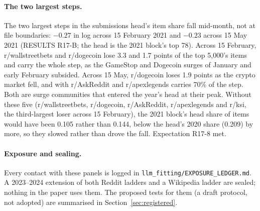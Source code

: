 \documentclass[10pt]{article}
\begin{document}
\paragraph{The two largest steps.}\label{sec:events} The two largest steps in the submissions head's item share fall mid-month, not at file boundaries: $-0.27$ in log across 15 February 2021 and $-0.23$ across 15 May 2021 (RESULTS R17-B; the head is the 2021 block's top 78). Across 15 February, r/wallstreetbets and r/dogecoin lose 3.3 and 1.7 points of the top 5,000's items and carry the whole step, as the GameStop and Dogecoin surges of January and early February subsided. Across 15 May, r/dogecoin loses 1.9 points as the crypto market fell, and with r/AskReddit and r/apexlegends carries 70\% of the step. Both are surge communities that entered the year's head at their peak. Without these five (r/wallstreetbets, r/dogecoin, r/AskReddit, r/apexlegends and r/ksi, the third-largest loser across 15 February), the 2021 block's head share of items would have been 0.105 rather than 0.144, below the head's 2020 share (0.209) by more, so they slowed rather than drove the fall. Expectation R17-8 met.
\paragraph{Exposure and sealing.} Every contact with these panels is logged in \texttt{llm\_fitting/EXPOSURE\_LEDGER.md}. A 2023--2024 extension of both Reddit ladders and a Wikipedia ladder are sealed; nothing in the paper uses them. The proposed tests for them (a draft protocol, not adopted) are summarised in Section~\ref{sec:registered}.
\end{document}
